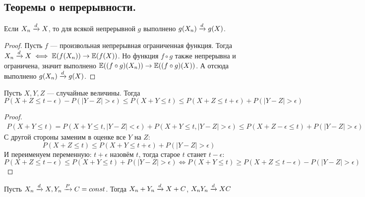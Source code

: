 \subsection{Теоремы о непрерывности.}
\begin{proposal}
    Если $X_n \xrightarrow{d} X$, то для всякой непрерывной $g$ выполнено $g(X_n) \xrightarrow{d} g(X)$.
\end{proposal}
\begin{proof}
    Пусть $f$ --- произвольная непрерывная ограниченная функция. Тогда $X_n \xrightarrow{d} X \iff \mathbb{E}(f(X_n)) \to \mathbb{E}(f(X))$.
    Но функция $f \circ g$ также непрерывна и ограничена, значит выполнено $\mathbb{E}((f \circ g)(X_n)) \to
    \mathbb{E}((f \circ g)(X))$. А отсюда выполнено $g(X_n) \xrightarrow{d} g(X)$.
\end{proof}
\begin{lemma}
    Пусть $X, Y, Z$ --- случайные величины. Тогда
    \[
        P(X + Z \leq t - \epsilon) - P(|Y- Z| > \epsilon) \leq
        P(X + Y \leq t) \leq P(X + Z \leq t + \epsilon) + P(|Y- Z| > \epsilon)
    \]
\end{lemma}
\begin{proof}
    \begin{align*}
        P(X + Y \leq t) = P(X + Y \leq t, |Y - Z| < \epsilon) + P(X + Y \leq t, |Y - Z| > \epsilon)
        \leq P(X + Z - \epsilon \leq t) + P(|Y - Z| > \epsilon)
    \end{align*}
    С другой стороны заменим в оценке все $Y$ на $Z$:
    \[
        P(X + Z \leq t) \leq P(X + Y \leq t + \epsilon) + P(|Y- Z| > \epsilon)
    \]
    И переименуем переменную: $t + \epsilon$ назовём $t$, тогда старое $t$ станет $t - \epsilon$:
    \[
        P(X + Z \leq t - \epsilon) \leq P(X + Y \leq t) + P(|Y- Z| > \epsilon)
        \iff P(X + Y \leq t) \geq P(X + Z \leq t - \epsilon) - P(|Y- Z| > \epsilon)
    \]
\end{proof}
\begin{theorem}
    Пусть $X_n \xrightarrow{d} X, Y_n \xrightarrow{P} C = const$. Тогда $X_n + Y_n \xrightarrow{d} X + C$, $X_{n}Y_n \xrightarrow{d} XC$
\end{theorem}
